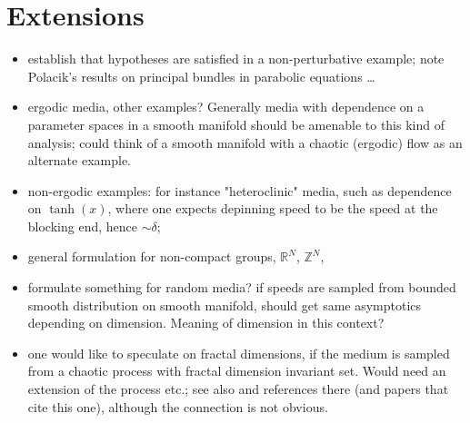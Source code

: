 \documentclass[letterpaper,11pt]{article}
\newcommand{\R}{\mathbb{R}}
\newcommand{\Z}{\mathbb{Z}}
\numberwithin{equation}{section}
\theoremstyle{plain}
\begin{document}
\section{Extensions}

\begin{itemize}

\item establish that hypotheses are satisfied in a non-perturbative example; note Polacik's results on principal bundles in parabolic equations \ldots
\item ergodic media, other examples? Generally media with dependence on a parameter spaces in a smooth manifold should be amenable to this kind of analysis; could think of a smooth manifold with a chaotic (ergodic) flow as an alternate example. 
\item non-ergodic examples: for instance "heteroclinic" media, such as dependence on $\tanh(x)$, where one expects depinning speed to be the speed at the blocking end, hence $\sim \delta$;
\item general formulation for non-compact groups, $\R^N$, $\Z^N$, 
\item formulate something for random media? if speeds are sampled from bounded smooth distribution on smooth manifold, should get same asymptotics depending on dimension. Meaning of dimension in this context? 
\item one would like to speculate on fractal dimensions, if the medium is sampled from a chaotic process with fractal dimension invariant set. Would need an extension of the process etc.; see also  \cite{vd} and references there (and papers that cite this one), although the connection is not obvious.
\end{itemize}
\end{document}
